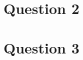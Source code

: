 \documentclass[12pt]{article}
\begin{document}






\section*{Question 2}

\section*{Question 3}
\end{document}
